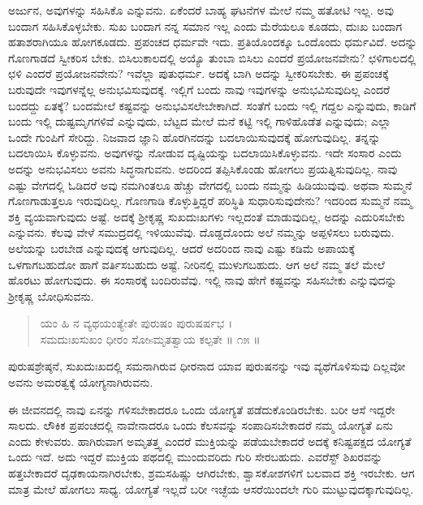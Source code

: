 ಅರ್ಜುನ, ಅವುಗಳನ್ನು ಸಹಿಸಿಕೊ ಎನ್ನುವನು. ಏಕೆಂದರೆ ಬಾಹ್ಯ ಘಟನೆಗಳ ಮೇಲೆ ನಮ್ಮ ಹತೋಟಿ ಇಲ್ಲ. ಅವು ಬಂದಾಗ ಸಹಿಸಿಕೊಳ್ಳಬೇಕು. ಸುಖ ಬಂದಾಗ ನನ್ನ ಸಮಾನ ಇಲ್ಲ ಎಂದು ಮೆರೆಯಲೂ ಕೂಡದು, ದುಃಖ ಬಂದಾಗ ಹತಾಶರಾಗಿಯೂ ಹೋಗಕೂಡದು. ಪ್ರಪಂಚದ ಧರ್ಮವೇ ಇದು. ಪ್ರತಿಯೊಂದಕ್ಕೂ ಒಂದೊಂದು ಧರ್ಮವಿದೆ. ಅದನ್ನು ಗೊಣಗಾಡದೆ ಸ್ವೀಕರಿಸ ಬೇಕು. ಬಿಸಿಲುಕಾಲದಲ್ಲಿ ಅಯ್ಯೊ ತುಂಬಾ ಬಿಸಿಲು ಎಂದರೆ ಪ್ರಯೋಜನವೇನು? ಛಳಿಗಾಲದಲ್ಲಿ ಛಳಿ ಎಂದರೆ ಪ್ರಯೋಜನವೇನು? ಇವೆಲ್ಲಾ ಪುತುಧರ್ಮ. ಅದಕ್ಕೆ ಬಾಗಿ ಅದನ್ನು ಸ್ವೀಕರಿಸಬೇಕು. ಈ ಪ್ರಪಂಚಕ್ಕೆ ಬರುವುದೇ ಇವುಗಳನ್ನೆಲ್ಲ ಅನುಭವಿಸುವುದಕ್ಕೆ. ಇಲ್ಲಿಗೆ ಬಂದು ನಾವು ಇವುಗಳನ್ನು ಅನುಭವಿಸುವುದಿಲ್ಲ ಎಂದರೆ ಬಂದದ್ದು ಏತಕ್ಕೆ? ಬಂದಮೇಲೆ ಕಷ್ಟವನ್ನು ಅನುಭವಿಸಲೇಬೇಕಾಗಿದೆ. ಸಂತೆಗೆ ಬಂದು ಇಲ್ಲಿ ಗದ್ದಲ ಎನ್ನುವುದು, ಕಾಡಿಗೆ ಬಂದು ಇಲ್ಲಿ ದುಷ್ಟಮೃಗಗಳಿವೆ ಎನ್ನುವುದು, ಬೆಟ್ಟದ ಮೇಲೆ ಮನೆ ಕಟ್ಟಿ ಇಲ್ಲಿ ಗಾಳಿಹೊಡೆತ ಎನ್ನುವುದು; ಎಲ್ಲಾ ಒಂದೇ ಗುಂಪಿಗೆ ಸೇರಿದ್ದು. ನಿಜವಾದ ಜ್ಞಾನಿ ಹೊರಗಿನದನ್ನು ಬದಲಾಯಿಸುವುದಕ್ಕೆ ಹೋಗುವುದಿಲ್ಲ. ತನ್ನನ್ನು ಬದಲಾಯಿಸಿ ಕೊಳ್ಳುವನು. ಅವುಗಳನ್ನು ನೋಡುವ ದೃಷ್ಟಿಯನ್ನು ಬದಲಾಯಿಸಿಕೊಳ್ಳುವನು. ಇದೇ ಸಂಸಾರ ಎಂದು ಅದನ್ನು ಅನುಭವಿಸಲು ಅವನು ಸಿದ್ಧನಾಗುವನು. ಅದರಿಂದ ತಪ್ಪಿಸಿಕೊಂಡು ಹೋಗಲು ಪ್ರಯತ್ನಿಸುವುದಿಲ್ಲ. ನಾವು ಎಷ್ಟು ವೇಗದಲ್ಲಿ ಓಡಿದರೆ ಅವು ನಮಗಿಂತಲೂ ಹೆಚ್ಚು ವೇಗದಲ್ಲಿ ಬಂದು ನಮ್ಮನ್ನು ಹಿಡಿಯುವುವು. ಅಥವಾ ಸುಮ್ಮನೆ ಗೊಣಗಾಡುತ್ತಲೂ ಇರುವುದಿಲ್ಲ. ಗೊಣಗಾಡಿ ಕೊಳ್ಳುತ್ತಿದ್ದರೆ ಪರಿಸ್ಥಿತಿ ಸುಧಾರಿಸುವುದೇನು? ಇದರಿಂದ ಸುಮ್ಮನೆ ನಮ್ಮ ಶಕ್ತಿ ವ್ಯಯವಾಗುವುದು ಅಷ್ಟೆ. ಅದಕ್ಕೆ ಶ್ರೀಕೃಷ್ಣ ಸುಖದುಃಖಗಳು ಇಲ್ಲದಂತೆ ಮಾಡುವುದಿಲ್ಲ, ಅದನ್ನು ಎದುರಿಸಬೇಕು ಎನ್ನುವನು. ಕೆಲವು ವೇಳೆ ಸಮುದ್ರದಲ್ಲಿ ಇಳಿಯುವೆವು. ದೊಡ್ಡದೊಂದು ಅಲೆ ನಮ್ಮನ್ನು ಅಪ್ಪಳಿಸಲು ಬರುವುದು. ಅಲೆಯನ್ನು ಬರಬೇಡ ಎನ್ನುವುದಕ್ಕೆ ಆಗುವುದಿಲ್ಲ. ಆದರೆ ಅದರಿಂದ ನಾವು ಎಷ್ಟು ಕಡಿಮೆ ಅಪಾಯಕ್ಕೆ ಒಳಗಾಗಬಹುದೋ ಹಾಗೆ ವರ್ತಿಸಬಹುದು ಅಷ್ಟೆ. ನೀರಿನಲ್ಲಿ ಮುಳುಗಬಹುದು. ಆಗ ಅಲೆ ನಮ್ಮ ತಲೆ ಮೇಲೆ ಹೊರಟು ಹೋಗುವುದು. ಈ ಸಂಸಾರಕ್ಕೆ ಬಂದಿರುವೆವು. ಇಲ್ಲಿ ನಾವು ಹೇಗೆ ಕಷ್ಟವನ್ನು ಸಹಿಸಬೇಕು ಎನ್ನುವುದನ್ನು ಶ್ರೀಕೃಷ್ಣ ಬೋಧಿಸುವನು.

\begin{verse}
ಯಂ ಹಿ ನ ವ್ಯಥಯಂತ್ಯೇತೇ ಪುರುಷಂ ಪುರುಷರ್ಷಭ ।\\ಸಮದುಃಖಸುಖಂ ಧೀರಂ ಸೋsಮೃತತ್ವಾಯ ಕಲ್ಪತೇ \num{॥ ೧೫ ॥}
\end{verse}

{\small ಪುರುಷಶ್ರೇಷ್ಠನೆ, ಸುಖದುಃಖದಲ್ಲಿ ಸಮನಾಗಿರುವ ಧೀರನಾದ ಯಾವ ಪುರುಷನನ್ನು ಇವು ವ್ಯಥೆಗೊಳಿಸುವು ದಿಲ್ಲವೋ ಅವನು ಅಮರತ್ವಕ್ಕೆ ಯೋಗ್ಯನಾಗಿರುವನು.}

ಈ ಜೀವನದಲ್ಲಿ ನಾವು ಏನನ್ನು ಗಳಿಸಬೇಕಾದರೂ ಒಂದು ಯೋಗ್ಯತೆ ಪಡೆದುಕೊಂಡಿರಬೇಕು. ಬರೀ ಆಸೆ ಇದ್ದರೇ ಸಾಲದು. ಲೌಕಿಕ ಪ್ರಪಂಚದಲ್ಲಿ ನಾವೇನಾದರೂ ಒಂದು ಕೆಲಸವನ್ನು ಸಂಪಾದಿಸಬೇಕಾದರೆ ನಮ್ಮ ಯೋಗ್ಯತೆ ಏನು ಎಂದು ಕೇಳುವರು. ಹಾಗಿರುವಾಗ ಅಮೃತತ್ತ್ವ ಎಂದರೆ ಮುಕ್ತಿಯನ್ನು ಪಡೆಯಬೇಕಾದರೆ ಅದಕ್ಕೆ ಕನಿಷ್ಟಪಕ್ಷದ ಯೋಗ್ಯತೆ ಒಂದು ಇದೆ. ಅದು ಇದ್ದರೆ ಮುಕ್ತಿಯ ಪಥದಲ್ಲಿ ಮುಂದುವರಿದು ಗುರಿ ಸೇರಬಹುದು. ಎವರೆಸ್ಟ್ ಶಿಖರವನ್ನು ಹತ್ತಬೇಕಾದರೆ ದೃಢಕಾಯನಾಗಿರಬೇಕು, ಶ್ರಮಸಹಿಷ್ಣು ಆಗಿರಬೇಕು, ಶ್ವಾಸಕೋಶಗಳಿಗೆ ಬಲವಾದ ಶಕ್ತಿ ಇರಬೇಕು. ಆಗ ಮಾತ್ರ ಮೇಲೆ ಹೋಗಲು ಸಾಧ್ಯ. ಯೋಗ್ಯತೆ ಇಲ್ಲದೆ ಬರೀ ಇಚ್ಛೆಯ ಆಸರೆಯಿಂದಲೇ ಗುರಿ ಮುಟ್ಟುವುದಕ್ಕಾಗುವುದಿಲ್ಲ.


